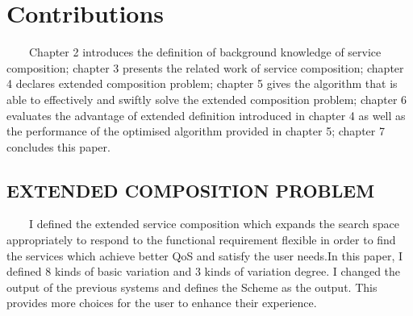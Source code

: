 \documentclass[senior,final,11pt]{iscs-thesis}
\begin{document}
\section{Contributions}
~~~~Chapter 2 introduces the definition of background knowledge of service composition; chapter 3 presents the related work of service composition; chapter 4 declares extended composition problem; chapter 5 gives the algorithm that is able to effectively and swiftly solve the extended composition problem; chapter 6 evaluates the advantage of extended definition introduced in chapter 4 as well as the performance of the optimised algorithm provided in chapter 5; chapter 7 concludes this paper.
\subsection{EXTENDED COMPOSITION PROBLEM}
~~~~I defined the extended service composition which expands the search space appropriately to respond to the functional requirement flexible in order to find the services which achieve better QoS and satisfy the user needs.In this paper, I defined 8 kinds of basic variation and 3 kinds of variation degree.
I changed the output of the previous systems and defines the Scheme as the output. This provides more choices for the user to enhance their experience.
\end{document}
